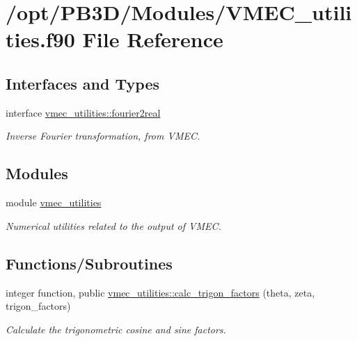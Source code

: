 \hypertarget{VMEC__utilities_8f90}{}\section{/opt/\+P\+B3\+D/\+Modules/\+V\+M\+E\+C\+\_\+utilities.f90 File Reference}
\label{VMEC__utilities_8f90}
\subsection*{Interfaces and Types}
\begin{DoxyCompactItemize}
\item 
interface \hyperlink{interfacevmec__utilities_1_1fourier2real}{vmec\+\_\+utilities\+::fourier2real}
\begin{DoxyCompactList}\small\item\em Inverse Fourier transformation, from V\+M\+EC. \end{DoxyCompactList}\end{DoxyCompactItemize}
\subsection*{Modules}
\begin{DoxyCompactItemize}
\item 
module \hyperlink{namespacevmec__utilities}{vmec\+\_\+utilities}
\begin{DoxyCompactList}\small\item\em Numerical utilities related to the output of V\+M\+EC. \end{DoxyCompactList}\end{DoxyCompactItemize}
\subsection*{Functions/\+Subroutines}
\begin{DoxyCompactItemize}
\item 
integer function, public \hyperlink{namespacevmec__utilities_ac699116fc25fdea3e28e488513d97c87}{vmec\+\_\+utilities\+::calc\+\_\+trigon\+\_\+factors} (theta, zeta, trigon\+\_\+factors)
\begin{DoxyCompactList}\small\item\em Calculate the trigonometric cosine and sine factors. \end{DoxyCompactList}\end{DoxyCompactItemize}
